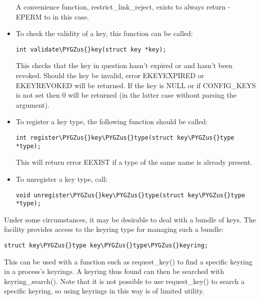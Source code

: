 \documentclass[a4paper,8pt,english]{sphinxmanual}
\def\PYGZus{\char`\_}
\begin{document}
\begin{itemize}
A convenience function, restrict\_link\_reject, exists to always return
-EPERM to in this case.

\item {} 
To check the validity of a key, this function can be called:

\begin{Verbatim}[commandchars=\\\{\}]
int validate\PYGZus{}key(struct key *key);
\end{Verbatim}

This checks that the key in question hasn't expired or and hasn't been
revoked. Should the key be invalid, error EKEYEXPIRED or EKEYREVOKED will
be returned. If the key is NULL or if CONFIG\_KEYS is not set then 0 will be
returned (in the latter case without parsing the argument).

\item {} 
To register a key type, the following function should be called:

\begin{Verbatim}[commandchars=\\\{\}]
int register\PYGZus{}key\PYGZus{}type(struct key\PYGZus{}type *type);
\end{Verbatim}

This will return error EEXIST if a type of the same name is already
present.

\item {} 
To unregister a key type, call:

\begin{Verbatim}[commandchars=\\\{\}]
void unregister\PYGZus{}key\PYGZus{}type(struct key\PYGZus{}type *type);
\end{Verbatim}

\end{itemize}

Under some circumstances, it may be desirable to deal with a bundle of keys.
The facility provides access to the keyring type for managing such a bundle:

\begin{Verbatim}[commandchars=\\\{\}]
struct key\PYGZus{}type key\PYGZus{}type\PYGZus{}keyring;
\end{Verbatim}

This can be used with a function such as request\_key() to find a specific
keyring in a process's keyrings.  A keyring thus found can then be searched
with keyring\_search().  Note that it is not possible to use request\_key() to
search a specific keyring, so using keyrings in this way is of limited utility.
\end{document}
